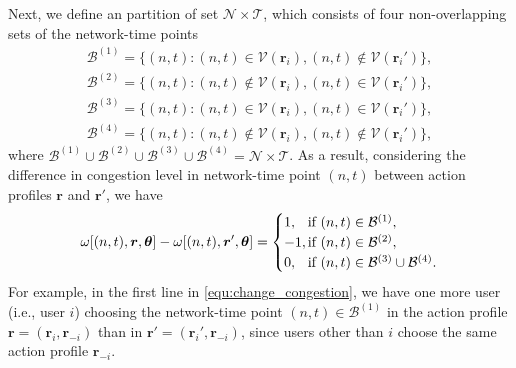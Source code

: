 \documentclass[journal]{IEEEtran}
\newcommand{\mc}[1]{\mathcal{#1}}
\newcommand{\bs}[1]{\boldsymbol{#1}}
\begin{document}
	Next, we define an partition of set $\mathcal{N} \times \mathcal{T}$, which consists of four non-overlapping sets of the network-time points
%
\begin{equation} %
\begin{split}
	\mc{B}^{(1)} = \{ (n,t): (n,t) \in \mc{V}(\bs{r}_i), (n,t) \notin \mc{V}(\bs{r}_i') \}, \\
	\mc{B}^{(2)} = \{ (n,t): (n,t) \notin \mc{V}(\bs{r}_i), (n,t) \in \mc{V}(\bs{r}_i') \}, \\
	\mc{B}^{(3)} = \{ (n,t): (n,t) \in \mc{V}(\bs{r}_i), (n,t) \in \mc{V}(\bs{r}_i') \}, \\
	\mc{B}^{(4)} = \{ (n,t): (n,t) \notin \mc{V}(\bs{r}_i), (n,t) \notin \mc{V}(\bs{r}_i') \},
\end{split}
\end{equation}
%
where $\mathcal{B}^{(1)} \cup \mathcal{B}^{(2)} \cup \mathcal{B}^{(3)} \cup \mathcal{B}^{(4)} = \mc{N} \times \mc{T}$.	
  As a result, considering the difference in congestion level in network-time point $(n,t)$ between action profiles $\boldsymbol{r}$ and $\boldsymbol{r}'$, we have
%
\begin{equation} \label{equ:change_congestion}
	\omega[(n,t), \boldsymbol{r}, \boldsymbol{\theta}] - \omega[(n,t), \boldsymbol{r}', \boldsymbol{\theta}] = 
\begin{cases} 
	  1, & \hspace{-0.3cm} \mbox{if } (n,t) \in \mc{B}^{(1)}, \\ 
	  -1, & \hspace{-0.3cm} \mbox{if } (n,t) \in \mc{B}^{(2)}, \\ 
	  0, & \hspace{-0.3cm} \mbox{if } (n,t) \in \mc{B}^{(3)} \cup \mc{B}^{(4)}. \\ 	
\end{cases} 
\end{equation}
	For example, in the first line in \eqref{equ:change_congestion}, we have one more user (i.e., user $i$) choosing the network-time point $(n,t) \in \mc{B}^{(1)}$ in the action profile $\bs{r} = (\bs{r}_i, \bs{r}_{-i})$ than in $\bs{r}' = (\bs{r}_i', \bs{r}_{-i})$, since users other than $i$ choose the same action profile $\bs{r}_{-i}$.
	
\end{document}
